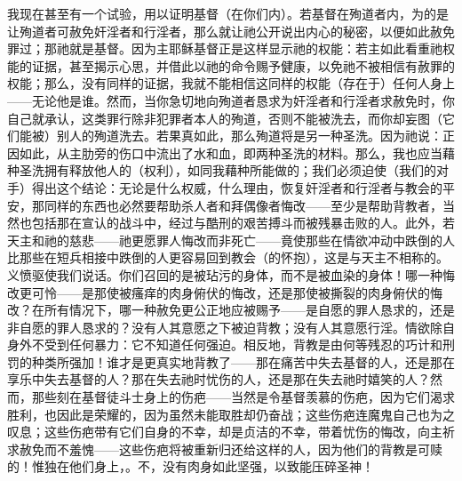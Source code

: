 我现在甚至有一个试验，用以证明基督（在你们内）。若基督在殉道者内，为的是让殉道者可赦免奸淫者和行淫者，那么就让祂公开说出内心的秘密，以便如此赦免罪过；那祂就是基督。因为主耶稣基督正是这样显示祂的权能：若主如此看重祂权能的证据，甚至揭示心思，并借此以祂的命令赐予健康，以免祂不被相信有赦罪的权能；那么，没有同样的证据，我就不能相信这同样的权能（存在于）任何人身上——无论他是谁。然而，当你急切地向殉道者恳求为奸淫者和行淫者求赦免时，你自己就承认，这类罪行除非犯罪者本人的殉道，否则不能被洗去，而你却妄图（它们能被）别人的殉道洗去。若果真如此，那么殉道将是另一种圣洗。因为祂说：正因如此，从主肋旁的伤口中流出了水和血，即两种圣洗的材料。那么，我也应当藉种圣洗拥有释放他人的（权利），如同我藉种所能做的；我们必须迫使（我们的对手）得出这个结论：无论是什么权威，什么理由，恢复奸淫者和行淫者与教会的平安，那同样的东西也必然要帮助杀人者和拜偶像者悔改——至少是帮助背教者，当然也包括那在宣认的战斗中，经过与酷刑的艰苦搏斗而被残暴击败的人。此外，若天主和祂的慈悲——祂更愿罪人悔改而非死亡——竟使那些在情欲冲动中跌倒的人比那些在短兵相接中跌倒的人更容易回到教会（的怀抱），这是与天主不相称的。义愤驱使我们说话。你们召回的是被玷污的身体，而不是被血染的身体！哪一种悔改更可怜——是那使被瘙痒的肉身俯伏的悔改，还是那使被撕裂的肉身俯伏的悔改？在所有情况下，哪一种赦免更公正地应被赐予——是自愿的罪人恳求的，还是非自愿的罪人恳求的？没有人其意愿之下被迫背教；没有人其意愿行淫。情欲除自身外不受到任何暴力：它不知道任何强迫。相反地，背教是由何等残忍的巧计和刑罚的种类所强加！谁才是更真实地背教了——那在痛苦中失去基督的人，还是那在享乐中失去基督的人？那在失去祂时忧伤的人，还是那在失去祂时嬉笑的人？然而，那些刻在基督徒斗士身上的伤疤——当然是令基督羡慕的伤疤，因为它们渴求胜利，也因此是荣耀的，因为虽然未能取胜却仍奋战；这些伤疤连魔鬼自己也为之叹息；这些伤疤带有它们自身的不幸，却是贞洁的不幸，带着忧伤的悔改，向主祈求赦免而不羞愧——这些伤疤将被重新归还给这样的人，因为他们的背教是可赎的！惟独在他们身上，。不，没有肉身如此坚强，以致能压碎圣神！\par

